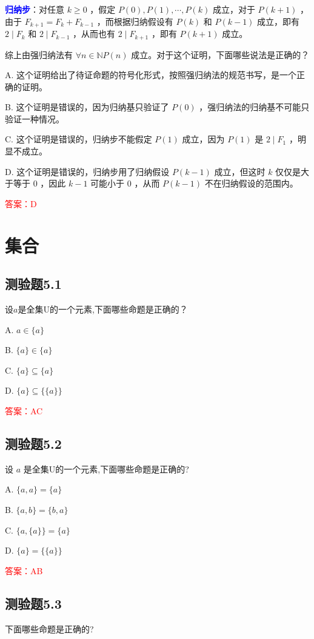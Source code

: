 \documentclass[UTF8, heading=true]{ctexart}
\begin{document}
\textcolor{blue}{\textbf{归纳步}}：对任意 $k \geq 0$ ，假定 $P(0), P(1), \cdots, P(k)$ 成立，对于 $P(k+1)$ ，由于 $F_{k+1}=F_k+F_{k-1}$ ，而根据归纳假设有 $P(k)$ 和 $P(k-1)$ 成立，即有 $2 \mid F_k$ 和 $2 \mid F_{k-1}$ ，从而也有 $2 \mid F_{k+1}$ ，即有 $P(k+1)$ 成立。

综上由强归纳法有 $\forall n \in \mathbb{N} P(n)$ 成立。对于这个证明，下面哪些说法是正确的？

A. 这个证明给出了待证命题的符号化形式，按照强归纳法的规范书写，是一个正确的证明。

B. 这个证明是错误的，因为归纳基只验证了 $P(0)$ ，强归纳法的归纳基不可能只验证一种情况。

C. 这个证明是错误的，归纳步不能假定 $P(1)$ 成立，因为 $P(1)$ 是 $2 \mid F_1$ ，明显不成立。

D. 
这个证明是错误的，归纳步用了归纳假设 $P(k-1)$ 成立，但这时 $k$ 仅仅是大于等于 0 ，因此 $k-1$ 可能小于 0 ，从而 $P(k-1)$ 不在归纳假设的范围内。

\textcolor{red}{答案：D}

\clearpage

\section{集合}

\subsection{测验题5.1}
设$a$是全集U的一个元素,下面哪些命题是正确的？

A. $ a \in\{a\}$

B. $\{a\} \in\{a\}$

C. $\{a\} \subseteq\{a\}$

D. $\{a\} \subseteq\{\{a\}\}$

\textcolor{red}{答案：AC}

\subsection{测验题5.2}

设 $a$ 是全集U的一个元素,下面哪些命题是正确的?

A. $\{a, a\}=\{a\}$

B. $\{a, b\}=\{b, a\}$

C. $\{a,\{a\}\}=\{a\}$

D. $\{a\}=\{\{a\}\}$

\textcolor{red}{答案：AB}

\subsection{测验题5.3}
下面哪些命题是正确的?
\end{document}

